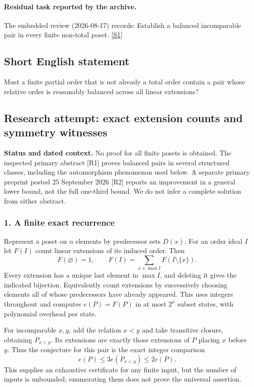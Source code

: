 \documentclass[11pt,a4paper]{article}
\newcommand{\sref}[2]{\hyperlink{source:#1:#2}{[S#2]}}
\begin{document}
\paragraph{Residual task reported by the archive.}

The embedded review (2026-08-17) records: Establish a balanced incomparable pair in every finite non-total poset. \sref{1319}{1}

\subsection{Short English statement}

Must a finite partial order that is not already a total order contain a pair whose relative order is reasonably balanced across all linear extensions?

\subsection{Research attempt: exact extension counts and symmetry witnesses}
\textbf{Status and dated context.} No proof for all finite posets is obtained. The inspected primary abstract [R1] proves balanced pairs in several structured classes, including the automorphism phenomenon used below. A separate primary preprint posted 25 September 2026 [R2] reports an improvement in a general lower bound, not the full one-third bound. We do not infer a complete solution from either abstract.

\subsubsection{1. A finite exact recurrence}
Represent a poset on $n$ elements by predecessor sets $D(x)$. For an order ideal $I$ let $F(I)$ count linear extensions of its induced order. Then
\[F(\varnothing)=1,\qquad F(I)=\sum_{x\in\max I}F(I\setminus\{x\}).\tag{1}\]
Every extension has a unique last element in $\max I$, and deleting it gives the indicated bijection. Equivalently count extensions by successively choosing elements all of whose predecessors have already appeared. This uses integers throughout and computes $e(P)=F(P)$ in at most $2^n$ subset states, with polynomial overhead per state.

For incomparable $x,y$, add the relation $x<y$ and take transitive closure, obtaining $P_{x<y}$. Its extensions are exactly those extensions of $P$ placing $x$ before $y$. Thus the conjecture for this pair is the exact integer comparison
\[e(P)\leq3e(P_{x<y})\leq2e(P).\tag{2}\]
This supplies an exhaustive certificate for any finite input, but the number of inputs is unbounded; enumerating them does not prove the universal assertion.
\end{document}
